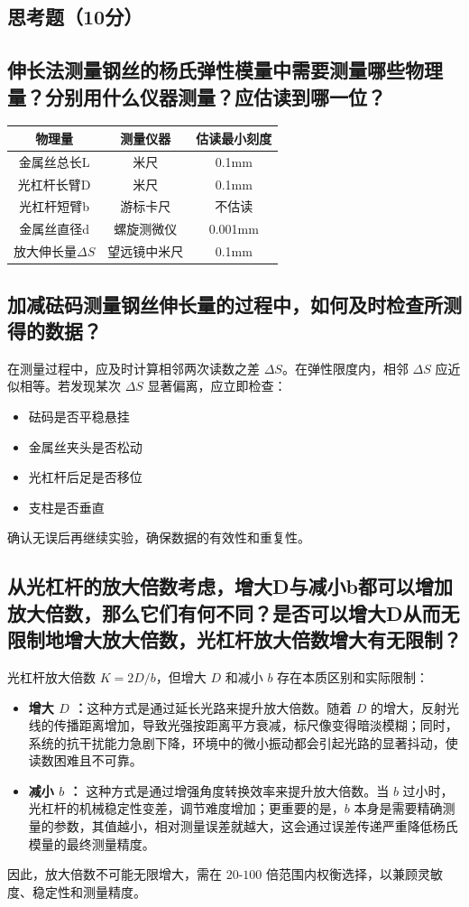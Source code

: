 \documentclass[]{../../templates/Report}%
\begin{document}
\begin{fullreportonly}
\section{思考题（10分）}
\subsection{伸长法测量钢丝的杨氏弹性模量中需要测量哪些物理量？分别用什么仪器测量？应估读到哪一位？}
\begin{table}[H]
	\centering
	\begin{tabular}{|c|c|c|}
		\hline
		\textbf{物理量} & \textbf{测量仪器} & \textbf{估读最小刻度} \\
		\hline
		金属丝总长L & 米尺 & 0.1mm \\
		\hline
		光杠杆长臂D & 米尺 & 0.1mm \\
		\hline
		光杠杆短臂b & 游标卡尺 & 不估读 \\
		\hline
		金属丝直径d & 螺旋测微仪 & 0.001mm \\
		\hline
		放大伸长量$\Delta S$ & 望远镜中米尺 & 0.1mm \\
		\hline
	\end{tabular}
\end{table}
\subsection{加减砝码测量钢丝伸长量的过程中，如何及时检查所测得的数据？}

在测量过程中，应及时计算相邻两次读数之差 $\Delta S$。在弹性限度内，相邻 $\Delta S$ 应近似相等。若发现某次 $\Delta S$ 显著偏离，应立即检查：
\begin{itemize}
\item 砝码是否平稳悬挂
\item 金属丝夹头是否松动
\item 光杠杆后足是否移位
\item 支柱是否垂直
\end{itemize}
确认无误后再继续实验，确保数据的有效性和重复性。

\subsection{从光杠杆的放大倍数考虑，增大D与减小b都可以增加放大倍数，那么它们有何不同？是否可以增大D从而无限制地增大放大倍数，光杠杆放大倍数增大有无限制？}

光杠杆放大倍数 $K = 2D/b$，但增大 $D$ 和减小 $b$ 存在本质区别和实际限制：
\begin{itemize}
\item \textbf{增大 $D$ ：}这种方式是通过延长光路来提升放大倍数。随着 $D$ 的增大，反射光线的传播距离增加，导致光强按距离平方衰减，标尺像变得暗淡模糊；同时，系统的抗干扰能力急剧下降，环境中的微小振动都会引起光路的显著抖动，使读数困难且不可靠。
\item \textbf{减小 $b$ ：} 这种方式是通过增强角度转换效率来提升放大倍数。当 $b$ 过小时，光杠杆的机械稳定性变差，调节难度增加；更重要的是，$b$ 本身是需要精确测量的参数，其值越小，相对测量误差就越大，这会通过误差传递严重降低杨氏模量的最终测量精度。
\end{itemize}
因此，放大倍数不可能无限增大，需在 $20$-$100$ 倍范围内权衡选择，以兼顾灵敏度、稳定性和测量精度。
\end{fullreportonly}
\newpage
\insertnotes
\end{document}
